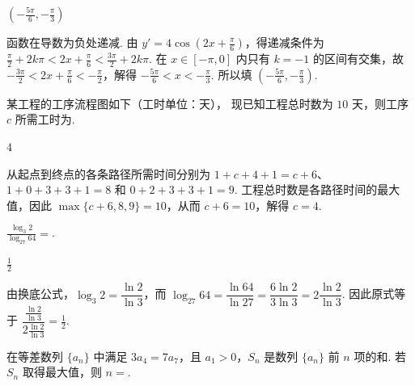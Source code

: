 \begin{answer}
\(\left(-\frac{5\pi}{6},-\frac{\pi}{3}\right)\)
\end{answer}

\begin{solution}
函数在导数为负处递减. 由 \(y'=4\cos\left(2x+\frac{\pi}{6}\right)\)，得递减条件为
\(\frac{\pi}{2}+2k\pi<2x+\frac{\pi}{6}<\frac{3\pi}{2}+2k\pi\). 在 \(x\in[-\pi,0]\) 内只有 \(k=-1\) 的区间有交集，故
\(-\frac{3\pi}{2}<2x+\frac{\pi}{6}< -\frac{\pi}{2}\)，解得 \(-\frac{5\pi}{6}<x< -\frac{\pi}{3}\). 所以填 \(\left(-\frac{5\pi}{6},-\frac{\pi}{3}\right)\).
\end{solution}

\begin{problem}
某工程的工序流程图如下（工时单位：天），
现已知工程总时数为 \(10\text{ 天}\)，则工序 \(c\) 所需工时为\fillinblank{}.

\end{problem}

\begin{answer}
\(4\)
\end{answer}

\begin{solution}
从起点到终点的各条路径所需时间分别为 \(1+c+4+1=c+6\)、\(1+0+3+3+1=8\) 和 \(0+2+3+3+1=9\). 工程总时数是各路径时间的最大值，因此 \(\max\{c+6,8,9\}=10\)，从而 \(c+6=10\)，解得 \(c=4\).
\end{solution}

\begin{problem}
\(\frac{\log_{3}2}{\log_{27}64}= \)\fillinblank{}.
\end{problem}

\begin{answer}
\(\frac{1}{2}\)
\end{answer}

\begin{solution}
由换底公式，\(\log_{3}2=\dfrac{\ln2}{\ln3}\)，而 \(\log_{27}64=\dfrac{\ln64}{\ln27}=\dfrac{6\ln2}{3\ln3}=2\dfrac{\ln2}{\ln3}\). 因此原式等于 \(\dfrac{\frac{\ln2}{\ln3}}{2\frac{\ln2}{\ln3}}=\frac12\).
\end{solution}

\begin{problem}
在等差数列 \(\{a_{n}\} \) 中满足 \(3a_{4}=7a_{7} \)，且 \(a_{1}>0\)，\(S_{n} \) 是数列 \(\{a_{n}\} \) 前 \(n\) 项的和. 若 \(S_{n} \) 取得最大值，则 \(n=\)\fillinblank{}.
\end{problem}

